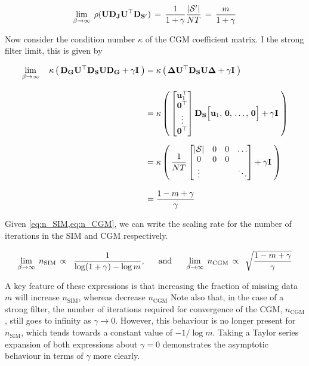 \begin{equation}
    \label{eq:beta_lim_inf}
    \lim_{\beta \rightarrow \infty} \; \rho(\mathbf{U} \mathbf{D}_{\mathbf{J}} \mathbf{U}^\top \mathbf{D}_{\mathbf{S}'}) \, = \, \frac{1}{1 + \gamma} \frac{|\mathcal{S}'|}{NT} \, = \, \frac{m}{1 + \gamma}
\end{equation}

Now consider the condition number $\kappa$ of the CGM coefficient matrix. I the strong filter limit, this is given by  

\begin{align}
    \lim_{\beta \rightarrow \infty} \quad \kappa \left(  \, \mathbf{D}_{\mathbf{G}} \mathbf{U}^\top \mathbf{D}_{\mathbf{S}} \mathbf{U} \mathbf{D}_{\mathbf{G}} + \gamma \mathbf{I} \; \right)  &= \kappa  \left(  \, \mathbf{\Delta} \mathbf{U}^\top \mathbf{D}_{\mathbf{S}} \mathbf{U} \mathbf{\Delta}  + \gamma \mathbf{I} \; \right) \notag \\[0.3cm]
    &= \kappa  \left(  \, 
    \begin{bmatrix} 
        \mathbf{u}_1^\top \\ 
        \mathbf{0}^\top \\
        \vdots \\ 
        \mathbf{0}^\top 
    \end{bmatrix} \mathbf{D}_{\mathbf{S}}  \Big[ \mathbf{u}_1, \, \mathbf{0}, \, \dots, \,\mathbf{0} \Big]
    + \gamma \mathbf{I} \; \right) \notag \\[0.2cm]
    &= \kappa  \left(  \, \frac{1}{NT}  \begin{bmatrix}
        |\mathcal{S}| & 0 & 0 & \dots \\
        0 & 0 & 0 &  \\
        \vdots & & & \ddots
    \end{bmatrix}   + \gamma \mathbf{I} \; \right) \notag \\[0.3cm]
    &= \frac{1 - m + \gamma}{\gamma}
\end{align}

Given \cref{eq:n_SIM,eq:n_CGM}, we can write the scaling rate for the number of iterations in the SIM and CGM respectively. 

\begin{equation}
    \label{eq:n_SFL}
    \lim_{\beta \rightarrow \infty} \;  n_\text{SIM} \, \propto \;\;  \frac{1}{\log(1 + \gamma) - \log m}, \;\; \quad \text{and} \quad \;\;  \lim_{\beta \rightarrow \infty} \;  n_\text{CGM} \, \propto \;\, \sqrt{\frac{1 - m + \gamma}{\gamma}}
\end{equation}


A key feature of these expressions is that increasing the fraction of missing data $m$ will increase $n_\text{SIM}$, whereas decrease $n_\text{CGM}$ Note also that, in the case of a strong filter, the number of iterations required for convergence of the CGM, $n_\text{CGM}$, still goes to infinity as $\gamma \rightarrow 0$. However, this behaviour is no longer present for $n_\text{SIM}$, which tends towards a constant value of $-1/\log m$. Taking a Taylor series expansion of both expressions about $\gamma=0$ demonstrates the asymptotic behaviour in terms of $\gamma$ more clearly. 

